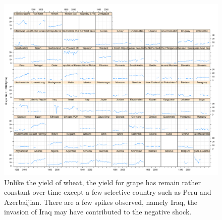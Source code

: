 \documentclass[nojss]{jss}\usepackage[]{graphicx}\usepackage[]{color}
\makeatletter
\def\maxwidth{ %
  \ifdim\Gin@nat@width>\linewidth
    \linewidth
  \else
    \Gin@nat@width
  \fi
}
\newenvironment{knitrout}{}{} %
\makeatother
\begin{document}
\begin{knitrout}
\color{fgcolor}\begin{figure}[!ht]


{\centering \includegraphics[width=\maxwidth]{figure/grape-yield-explore} 

}

\caption[Unlike the yield of wheat, the yield for grape has remain rather constant over time except a few selective country such as Peru and Azerbaijian]{Unlike the yield of wheat, the yield for grape has remain rather constant over time except a few selective country such as Peru and Azerbaijian. There are a few spikes observed, namely Iraq, the invasion of Iraq may have contributed to the negative shock.\label{fig:grape-yield-explore}}
\end{figure}


\end{knitrout}
\end{document}
